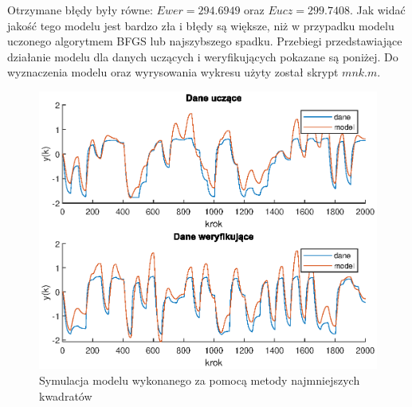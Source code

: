		Otrzymane błędy były równe: $Ewer = 294.6949$ oraz $Eucz = 299.7408$. Jak widać jakość tego modelu jest bardzo zła i błędy są większe, niż w przypadku modelu uczonego algorytmem BFGS lub najszybszego spadku. Przebiegi przedstawiające działanie modelu dla danych uczących i weryfikujących pokazane są poniżej. Do wyznaczenia modelu oraz wyrysowania wykresu użyty został skrypt $mnk.m$.
		
		\begin{figure}[h!]
			\centering
			\includegraphics[width=\linewidth]{img/mnk.eps}
			\caption{Symulacja modelu wykonanego za pomocą metody najmniejszych kwadratów}
			\label{fig:mnk}
		\end{figure}